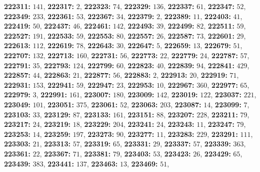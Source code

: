 \textsf{\bfseries 222311:} $141$, \textsf{\bfseries 222317:} $2$, \textsf{\bfseries 222323:} $74$, \textsf{\bfseries 222329:} $136$, \textsf{\bfseries 222337:} $61$, \textsf{\bfseries 222347:} $52$, \textsf{\bfseries 222349:} $233$, \textsf{\bfseries 222361:} $53$, \textsf{\bfseries 222367:} $34$, \textsf{\bfseries 222379:} $2$, \textsf{\bfseries 222389:} $11$, \textsf{\bfseries 222403:} $41$, \textsf{\bfseries 222419:} $50$, \textsf{\bfseries 222437:} $46$, \textsf{\bfseries 222461:} $142$, \textsf{\bfseries 222493:} $39$, \textsf{\bfseries 222499:} $82$, \textsf{\bfseries 222511:} $59$, \textsf{\bfseries 222527:} $191$, \textsf{\bfseries 222533:} $59$, \textsf{\bfseries 222553:} $80$, \textsf{\bfseries 222557:} $26$, \textsf{\bfseries 222587:} $73$, \textsf{\bfseries 222601:} $29$, \textsf{\bfseries 222613:} $112$, \textsf{\bfseries 222619:} $78$, \textsf{\bfseries 222643:} $30$, \textsf{\bfseries 222647:} $5$, \textsf{\bfseries 222659:} $13$, \textsf{\bfseries 222679:} $51$, \textsf{\bfseries 222707:} $132$, \textsf{\bfseries 222713:} $160$, \textsf{\bfseries 222731:} $56$, \textsf{\bfseries 222773:} $22$, \textsf{\bfseries 222779:} $24$, \textsf{\bfseries 222787:} $57$, \textsf{\bfseries 222791:} $35$, \textsf{\bfseries 222793:} $124$, \textsf{\bfseries 222799:} $60$, \textsf{\bfseries 222823:} $40$, \textsf{\bfseries 222839:} $94$, \textsf{\bfseries 222841:} $429$, \textsf{\bfseries 222857:} $44$, \textsf{\bfseries 222863:} $21$, \textsf{\bfseries 222877:} $56$, \textsf{\bfseries 222883:} $2$, \textsf{\bfseries 222913:} $20$, \textsf{\bfseries 222919:} $71$, \textsf{\bfseries 222931:} $153$, \textsf{\bfseries 222941:} $59$, \textsf{\bfseries 222947:} $23$, \textsf{\bfseries 222953:} $10$, \textsf{\bfseries 222967:} $360$, \textsf{\bfseries 222977:} $65$, \textsf{\bfseries 222979:} $3$, \textsf{\bfseries 222991:} $161$, \textsf{\bfseries 223007:} $180$, \textsf{\bfseries 223009:} $142$, \textsf{\bfseries 223019:} $122$, \textsf{\bfseries 223037:} $221$, \textsf{\bfseries 223049:} $101$, \textsf{\bfseries 223051:} $375$, \textsf{\bfseries 223061:} $52$, \textsf{\bfseries 223063:} $203$, \textsf{\bfseries 223087:} $14$, \textsf{\bfseries 223099:} $7$, \textsf{\bfseries 223103:} $33$, \textsf{\bfseries 223129:} $87$, \textsf{\bfseries 223133:} $161$, \textsf{\bfseries 223151:} $88$, \textsf{\bfseries 223207:} $228$, \textsf{\bfseries 223211:} $79$, \textsf{\bfseries 223217:} $24$, \textsf{\bfseries 223219:} $18$, \textsf{\bfseries 223229:} $204$, \textsf{\bfseries 223241:} $24$, \textsf{\bfseries 223243:} $11$, \textsf{\bfseries 223247:} $79$, \textsf{\bfseries 223253:} $14$, \textsf{\bfseries 223259:} $197$, \textsf{\bfseries 223273:} $90$, \textsf{\bfseries 223277:} $11$, \textsf{\bfseries 223283:} $229$, \textsf{\bfseries 223291:} $111$, \textsf{\bfseries 223303:} $21$, \textsf{\bfseries 223313:} $57$, \textsf{\bfseries 223319:} $65$, \textsf{\bfseries 223331:} $29$, \textsf{\bfseries 223337:} $57$, \textsf{\bfseries 223339:} $363$, \textsf{\bfseries 223361:} $22$, \textsf{\bfseries 223367:} $71$, \textsf{\bfseries 223381:} $79$, \textsf{\bfseries 223403:} $53$, \textsf{\bfseries 223423:} $26$, \textsf{\bfseries 223429:} $65$, \textsf{\bfseries 223439:} $383$, \textsf{\bfseries 223441:} $137$, \textsf{\bfseries 223463:} $13$, \textsf{\bfseries 223469:} $51$, 
